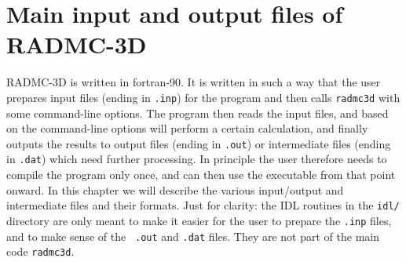 \documentclass{report}
\begin{document}
\appendix


\chapter{Main input and output files of RADMC-3D}
\label{chap-input-files}
RADMC-3D is written in fortran-90. It is written in such a way that the user
prepares input files (ending in {\small\tt .inp}) for the program and then
calls {\small\tt radmc3d} with some command-line options. The program then
reads the input files, and based on the command-line options will perform a
certain calculation, and finally outputs the results to output files (ending
in {\small\tt .out}) or intermediate files (ending in {\small\tt .dat})
which need further processing. In principle the user therefore needs to
compile the program only once, and can then use the executable from that
point onward. In this chapter we will describe the various input/output and
intermediate files and their formats. Just for clarity: the IDL routines in
the {\small\tt idl/} directory are only meant to make it easier for the user
to prepare the {\small\tt .inp} files, and to make sense of the {\small\tt
  .out} and {\small\tt .dat} files. They are not part of the main code
{\small\tt radmc3d}.
\end{document}
